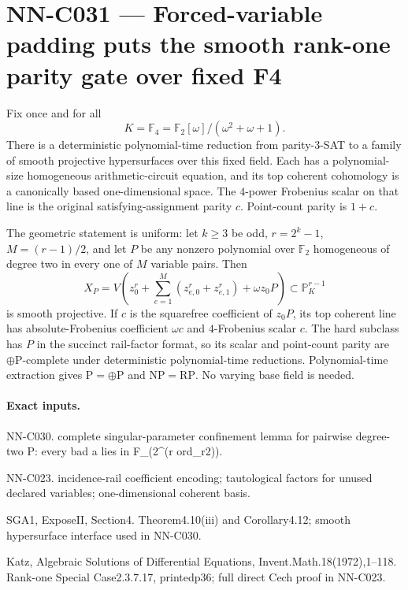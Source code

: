 \section{NN-C031 --- Forced-variable padding puts the smooth rank-one parity gate over fixed F4}
\begin{proposition}[NN-C031]
Fix once and for all
\[
 K=\mathbb F_4=\mathbb F_2[\omega]/(\omega^2+\omega+1).
\]
There is a deterministic polynomial-time reduction from parity-3-SAT to a family of smooth projective hypersurfaces over this fixed field. Each has a polynomial-size homogeneous arithmetic-circuit equation, and its top coherent cohomology is a canonically based one-dimensional space. The $4$-power Frobenius scalar on that line is the original satisfying-assignment parity $c$. Point-count parity is $1+c$.

The geometric statement is uniform: let $k\geq3$ be odd, $r=2^k-1$, $M=(r-1)/2$, and let $P$ be any nonzero polynomial over $\mathbb F_2$ homogeneous of degree two in every one of $M$ variable pairs. Then
\[
 X_P=V\left(z_0^r+\sum_{e=1}^{M}(z_{e,0}^r+z_{e,1}^r)
                         +\omega z_0P\right)
                       \subset\mathbb P^{r-1}_K
\]
is smooth projective. If $c$ is the squarefree coefficient of $z_0P$, its top coherent line has absolute-Frobenius coefficient $\omega c$ and $4$-Frobenius scalar $c$. The hard subclass has $P$ in the succinct rail-factor format, so its scalar and point-count parity are $\oplus\mathrm P$-complete under deterministic polynomial-time reductions. Polynomial-time extraction gives $\mathrm P=\oplus\mathrm P$ and $\mathrm{NP}=\mathrm{RP}$. No varying base field is needed.
\end{proposition}
\paragraph{Exact inputs.}
NN-C030. complete singular-parameter confinement lemma for pairwise degree-two P: every bad a lies in F\_(2\textasciicircum{}(r ord\_r2)).

NN-C023. incidence-rail coefficient encoding; tautological factors for unused declared variables; one-dimensional coherent basis.

SGA1, ExposeII, Section4. Theorem4.10(iii) and Corollary4.12; smooth hypersurface interface used in NN-C030.

Katz, Algebraic Solutions of Differential Equations, Invent.Math.18(1972),1--118. Rank-one Special Case2.3.7.17, printedp36; full direct Cech proof in NN-C023.


